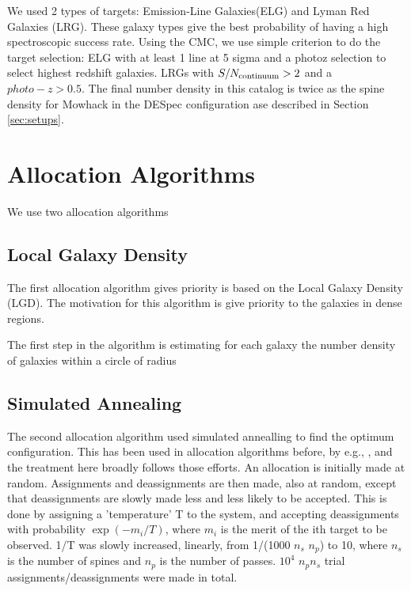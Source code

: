 \documentclass{article}
\begin{document}


We used 2 types of targets: Emission-Line Galaxies(ELG) and Lyman Red
Galaxies (LRG). These galaxy types give the best probability of having
a high spectroscopic success rate. Using the CMC, we use simple
criterion to do the target selection: ELG with
at least 1 line at 5 sigma and a photoz selection to select highest
redshift galaxies. LRGs with $S/N_{\rm continuum}>2$ and a
$photo-z>0.5$.  The final number density in this catalog is twice as
the spine density for Mowhack in the DESpec configuration  ase described in Section
\ref{sec:setups}.  

\section{Allocation Algorithms}

We use two allocation algorithms

\subsection{Local Galaxy Density}
The first allocation algorithm gives priority is based on the Local
Galaxy Density (LGD). The motivation for this algorithm is give
priority to the galaxies in dense regions.

The first step in the algorithm is estimating for each galaxy the
number density of galaxies within a circle of radius

\subsection{Simulated Annealing}
The second allocation algorithm used simulated annealling to find the
optimum configuration. This has been used in allocation algorithms before,
by e.g., \cite{Multi}, and the treatment here broadly follows those
efforts. An allocation is initially made at random. Assignments and
deassignments are then made, also at random, except that deassignments
are slowly made less and less likely to be accepted. This is done by assigning
a 'temperature' T to the system, and accepting deassignments with
probability $\exp(-m_i/T)$, where $m_i$ is the merit of the ith target to be
observed. 1/T was slowly increased, linearly, from 1/(1000 $n_s$ $n_p$) to 10,
where $n_s$ is the number of spines and $n_p$ is the number of passes. $10^4$
$n_pn_s$ trial assignments/deassignments were made in total.
\end{document}
